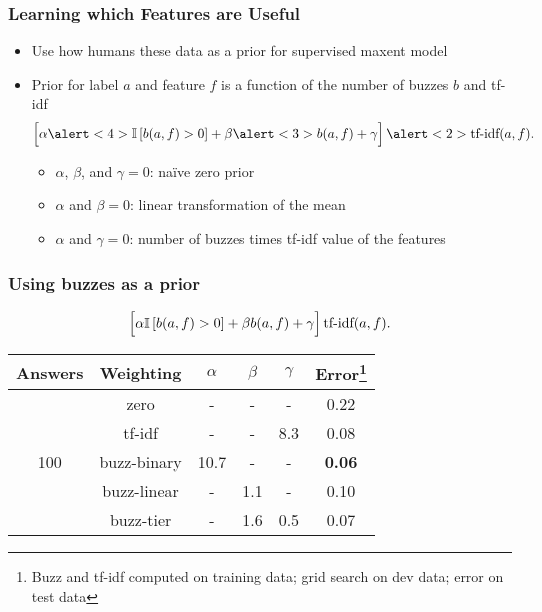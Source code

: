 

\begin{frame}
	\frametitle{Learning which Features are Useful}

	\begin{itemize}
		\item Use how humans these data as a prior for supervised maxent model~\cite{daume-04}
		\item Prior for label $a$ and feature $f$ is a function of the number of buzzes $b$ and tf-idf~\cite{salton-68}
\begin{equation}
  \left[ \vphantom{\frac{a}{b}}\alpha \alert<4>{\ind{ b(a,f) > 0}} + \beta \alert<3>{ b(a,f)} + \gamma
  \right] \alert<2>{\mbox{tf-idf}(a,f)} .
\label{eq:meanweight}
\end{equation}
		\begin{itemize}
			\item $\alpha$, $\beta$, and $\gamma = 0$: na\"ive zero prior
			\item $\alpha$ and $\beta = 0$: linear transformation of the mean
			\item $\alpha$ and $\gamma = 0$: number of buzzes times tf-idf value of the features
		\end{itemize}

	\end{itemize}

\end{frame}

\begin{frame}
	\frametitle{Using buzzes as a prior}

\begin{equation*}
  \left[ \vphantom{\frac{a}{b}}\alpha \ind{ b(a,f) > 0} + \beta b(a,f) + \gamma
  \right] \mbox{tf-idf}(a,f) .
\end{equation*}

\begin{center}
\begin{tabular}{cccccc}
Answers & Weighting & $\alpha$ & $\beta$ & $\gamma$ & Error\footnote{Buzz and tf-idf computed on training data; grid search on dev data; error on test data} \\
\hline
\multirow{5}{*}{100} & zero & - & - & - & 0.22 \\
& tf-idf & - & - & 8.3 & 0.08 \\
&  buzz-binary & 10.7 & - & - & {\bf 0.06} \\
&  buzz-linear & - &  1.1 & - & 0.10 \\
& buzz-tier & - & 1.6 & 0.5 & 0.07 \\
\hline
\end{tabular}
\end{center}
\end{frame}


